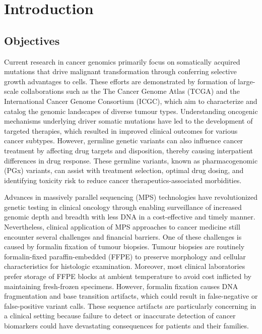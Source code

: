 
\chapter{Introduction}
\label{ch:Introduction}

\section{Objectives}
\label{sec:Objectives}

Current research in cancer genomics primarily focus on somatically acquired mutations that drive malignant transformation through conferring selective growth advantages to cells. These efforts are demonstrated by formation of large-scale collaborations such as the The Cancer Genome Atlas (TCGA) and the International Cancer Genome Consortium (ICGC), which aim to characterize and catalog the genomic landscapes of diverse tumour types. Understanding oncogenic mechanisms underlying driver somatic mutations have led to the development of targeted therapies, which resulted in improved clinical outcomes for various cancer subtypes. However, germline genetic variants can also influence cancer treatment by affecting drug targets and disposition, thereby causing interpatient differences in drug response. These germline variants, known as pharmacogenomic (PGx) variants, can assist with treatment selection, optimal drug dosing, and identifying toxicity risk to reduce cancer therapeutics-associated morbidities.

Advances in massively parallel sequencing (MPS) technologies have revolutionized genetic testing in clinical oncology through enabling surveillance of increased genomic depth and breadth with less DNA in a cost-effective and timely manner. Nevertheless, clinical application of MPS approaches to cancer medicine still encounter several challenges and financial barriers. One of these challenges is caused by formalin fixation of tumour biopsies. Tumour biopsies are routinely formalin-fixed paraffin-embedded (FFPE) to preserve morphology and cellular characteristics for histologic examination. Moreover, most clinical laboratories prefer storage of FFPE blocks at ambient temperature to avoid cost inflicted by maintaining fresh-frozen specimens. However, formalin fixation causes DNA fragmentation and base transition artifacts, which could result in false-negative or false-positive variant calls. These sequence artifacts are particularly concerning in a clinical setting because failure to detect or inaccurate detection of cancer biomarkers could have devastating consequences for patients and their families.


